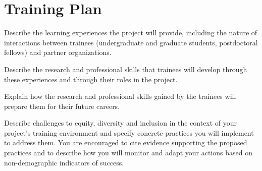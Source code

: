 \documentclass[english,
]{nserc-alliance}
\begin{document}


\section*{Training Plan}
\ifinst\begin{instructions}
  \item Describe the learning experiences the project will provide, including the nature of interactions between trainees (undergraduate and graduate students, postdoctoral fellows) and partner organizations. 
  \item	Describe the research and professional skills that trainees will develop through these experiences and through their roles in the project.
  \item Explain how the research and professional skills gained by the trainees will prepare them for their future careers.
  \item Describe challenges to equity, diversity and inclusion in the context of your project's training environment and specify concrete practices you will implement to address them. You are encouraged to cite evidence supporting the proposed practices and to describe how you will monitor and adapt your actions based on non-demographic indicators of success.
\end{instructions}\fi
  
\end{document}

